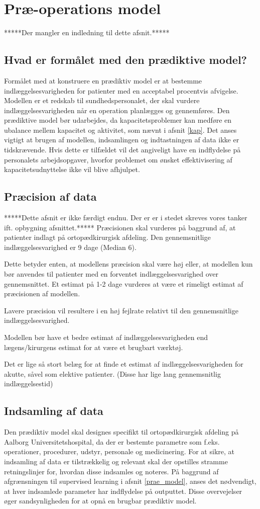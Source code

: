 \section{Præ-operations model} 
*****Der mangler en indledning til dette afsnit.*****

\subsection{Hvad er formålet med den prædiktive model?}
Formålet med at konstruere en prædiktiv model er at bestemme indlæggelsesvarigheden for patienter med en acceptabel procentvis afvigelse. Modellen er et redskab til sundhedspersonalet, der skal vurdere indlæggelsesvarigheden når en operation planlægges og gennemføres. Den prædiktive model bør udarbejdes, da kapacitetsproblemer kan medføre en ubalance mellem kapacitet og aktivitet, som nævnt i afsnit \ref{kap}. Det anses vigtigt at brugen af modellen, indsamlingen og indtastningen af data ikke er tidskrævende. Hvis dette er tilfældet vil det angiveligt have en indflydelse på personalets arbejdsopgaver, hvorfor problemet om ønsket effektivisering af kapacitetsudnyttelse ikke vil blive afhjulpet.

\subsection{Præcision af data}
*****Dette afsnit er ikke færdigt endnu. Der er er i stedet skreves vores tanker ift. opbygning afsnittet.*****
Præcisionen skal vurderes på baggrund af, at patienter indlagt på ortopædkirurgisk afdeling. Den gennemsnitlige indlæggelsesvarighed er 9 dage (Median 6). 

Dette betyder enten, at modellens præcision skal være høj eller, at modellen kun bør anvendes til patienter med en forventet indlæggelsesvarighed over gennemsnittet.
Et estimat på 1-2 dage vurderes at være et rimeligt estimat af præcisionen af modellen.

Lavere præcision vil resultere i en høj fejlrate relativt til den gennemsnitlige indlæggelsesvarighed.


Modellen bør have et bedre estimat af indlæggelsesvarigheden end lægens/kirurgens estimat for at være et brugbart værktøj. 


Det er lige så stort belæg for at finde et estimat af indlæggelsesvarigheden for akutte, såvel som elektive patienter. (Disse har lige lang gennemsnitlig indlæggelsestid)


\subsection{Indsamling af data}
Den prædiktiv model skal designes specifikt til ortopædkirurgisk afdeling på Aalborg Universitetshospital, da der er bestemte parametre som f.eks. operationer, procedurer, udstyr, personale og medicinering. For at sikre, at indsamling af data er tilstrækkelig og relevant skal der opstilles stramme retningslinjer for, hvordan disse indsamles og noteres. På baggrund af afgrænsningen til supervised learning i afsnit \ref{prae_model}, anses det nødvendigt, at hver indsamlede parameter har indflydelse på outputtet. Disse overvejelser øger sandsynligheden for at opnå en brugbar prædiktiv model. 


